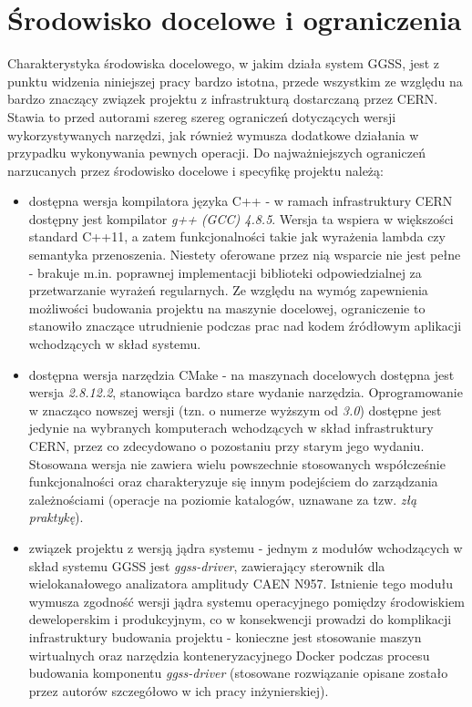 \section{Środowisko docelowe i ograniczenia}
Charakterystyka środowiska docelowego, w jakim działa system GGSS, jest z punktu widzenia niniejszej pracy bardzo istotna, przede wszystkim ze względu na bardzo znaczący związek projektu z infrastrukturą dostarczaną przez CERN. Stawia to przed autorami szereg szereg ograniczeń dotyczących wersji wykorzystywanych narzędzi, jak również wymusza dodatkowe działania w przypadku wykonywania pewnych operacji. Do najważniejszych ograniczeń narzucanych przez środowisko docelowe i specyfikę projektu należą:
\begin{itemize}
    \item dostępna wersja kompilatora języka C++ - w ramach infrastruktury CERN dostępny jest kompilator \emph{g++ (GCC) 4.8.5}. Wersja ta wspiera w większości standard C++11, a zatem funkcjonalności takie jak wyrażenia lambda czy semantyka przenoszenia. Niestety oferowane przez nią wsparcie nie jest pełne - brakuje m.in. poprawnej implementacji biblioteki odpowiedzialnej za przetwarzanie wyrażeń regularnych. Ze względu na wymóg zapewnienia możliwości budowania projektu na maszynie docelowej, ograniczenie to stanowiło znaczące utrudnienie podczas prac nad kodem źródłowym aplikacji wchodzących w skład systemu.
    \item dostępna wersja narzędzia CMake - na maszynach docelowych dostępna jest wersja \emph{2.8.12.2}, stanowiąca bardzo stare wydanie narzędzia. Oprogramowanie w znacząco nowszej wersji (tzn. o numerze wyższym od \emph{3.0}) dostępne jest jedynie na wybranych komputerach wchodzących w skład infrastruktury CERN, przez co zdecydowano o pozostaniu przy starym jego wydaniu. Stosowana wersja nie zawiera wielu powszechnie stosowanych współcześnie funkcjonalności oraz charakteryzuje się innym podejściem do zarządzania zależnościami (operacje na poziomie katalogów, uznawane za tzw. \emph{złą praktykę}).
    \item związek projektu z wersją jądra systemu - jednym z modułów wchodzących w skład systemu GGSS jest \emph{ggss-driver}, zawierający sterownik dla wielokanałowego analizatora amplitudy CAEN N957. Istnienie tego modułu wymusza zgodność wersji jądra systemu operacyjnego pomiędzy środowiskiem deweloperskim i produkcyjnym, co w konsekwencji prowadzi do komplikacji infrastruktury budowania projektu - konieczne jest stosowanie maszyn wirtualnych oraz narzędzia konteneryzacyjnego Docker podczas procesu budowania komponentu \emph{ggss-driver} (stosowane rozwiązanie opisane zostało przez autorów szczegółowo w ich pracy inżynierskiej).

\end{itemize}
